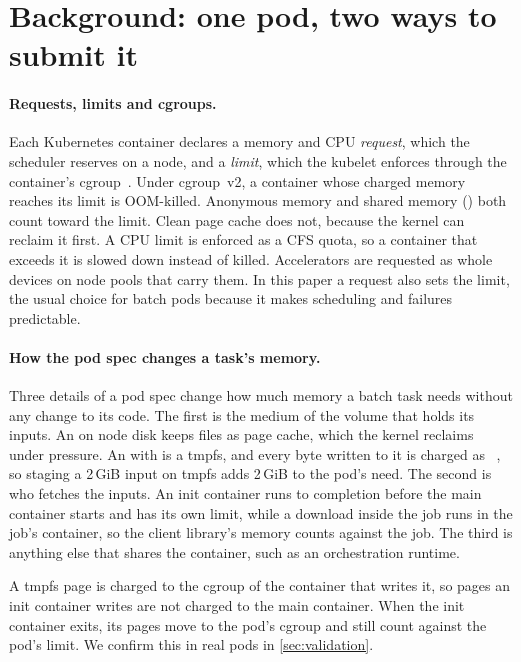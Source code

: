 \section{Background: one pod, two ways to submit it}
\label{sec:background}

\paragraph{Requests, limits and cgroups.}
Each Kubernetes container declares a memory and CPU \emph{request}, which the scheduler reserves on a node,
and a \emph{limit}, which the kubelet enforces through the container's cgroup~\citep{k8sresources,cgroupv2}.
Under cgroup~v2, a container whose charged memory reaches its limit is OOM-killed. Anonymous memory and
shared memory () both count toward the limit. Clean page cache does not, because the kernel can
reclaim it first. A CPU limit is enforced as a CFS quota, so a container that exceeds it is slowed down
instead of killed. Accelerators are requested as whole devices on node pools that carry them. In this paper a
request also sets the limit, the usual choice for batch pods because it makes scheduling and failures
predictable.

\paragraph{How the pod spec changes a task's memory.}
Three details of a pod spec change how much memory a batch task needs without any change to its code. The
first is the medium of the volume that holds its inputs. An  on node disk keeps files as page
cache, which the kernel reclaims under pressure. An  with  is a tmpfs, and
every byte written to it is charged as ~\citep{k8svolumes}, so staging a 2\,GiB input on tmpfs adds
2\,GiB to the pod's need. The second is who fetches the inputs. An init container runs to completion before the
main container starts and has its own limit, while a download inside the job runs in the job's container, so
the client library's memory counts against the job. The third is anything else that shares the container,
such as an orchestration runtime.

A tmpfs page is charged to the cgroup of the container that writes it, so pages an init container writes are
not charged to the main container. When the init container exits, its pages move to the pod's cgroup and still
count against the pod's limit. We confirm this in real pods in \cref{sec:validation}.

